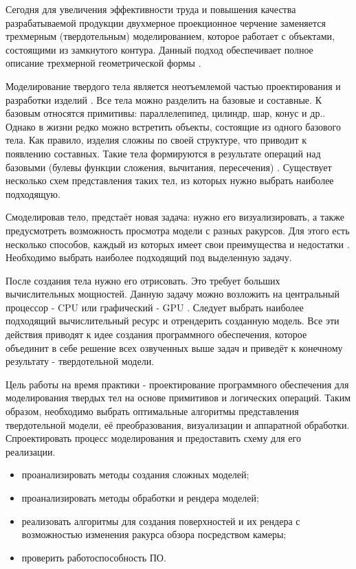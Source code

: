 \Introduction
Сегодня для увеличения эффективности труда и повышения качества разрабатываемой продукции двухмерное проекционное черчение заменяется трехмерным (твердотельным) моделированием, которое работает с объектами, состоящими из замкнутого контура. 
Данный подход обеспечивает полное описание трехмерной геометрической формы \cite{sapr}.

Моделирование твердого тела является неотъемлемой частью проектирования и разработки изделий \cite{article:solid_modeling}. 
Все тела можно разделить на базовые и составные. К базовым относятся примитивы: параллелепипед, цилиндр, шар, конус и др..
Однако в жизни редко можно встретить объекты, состоящие из одного базового тела. Как правило, изделия сложны по своей структуре, что приводит к появлению составных.
Такие тела формируются в результате операций над базовыми (булевы функции сложения, вычитания, пересечения) \cite{sapr}.
Существует несколько схем представления таких тел, из которых нужно выбрать наиболее подходящую.


Смоделировав тело, предстаёт новая задача: нужно его визуализировать, а также предусмотреть возможность просмотра модели с разных ракурсов. Для этого есть несколько способов, каждый из которых имеет свои преимущества и недостатки \cite{article:3d}. 
Необходимо выбрать наиболее подходящий под выделенную задачу. 


После создания тела нужно его отрисовать. Это требует больших вычислительных мощностей. 
Данную задачу можно возложить на центральный процессор - CPU или графический - GPU \cite{cpu_or_gpu}. Следует выбрать наиболее подходящий вычислительный ресурс и отрендерить созданную модель. 
Все эти действия приводят к идее создания программного обеспечения, которое объединит в себе решение всех озвученных выше задач и приведёт к конечному результату - твердотельной модели.

Цель работы на время практики - проектирование программного обеспечения для моделирования твердых тел на основе примитивов и логических операций. 
Таким образом, необходимо выбрать оптимальные алгоритмы представления твердотельной модели, её преобразования, 
визуализации и аппаратной обработки. 
Спроектировать процесс моделирования и предоставить схему для его реализации.
\begin{itemize}
\item проанализировать методы создания сложных моделей;
\item проанализировать методы обработки и рендера моделей;
\item реализовать алгоритмы для создания поверхностей и их рендера с возможностью изменения ракурса обзора посредством камеры;
\item проверить работоспособность ПО.
\end{itemize}

